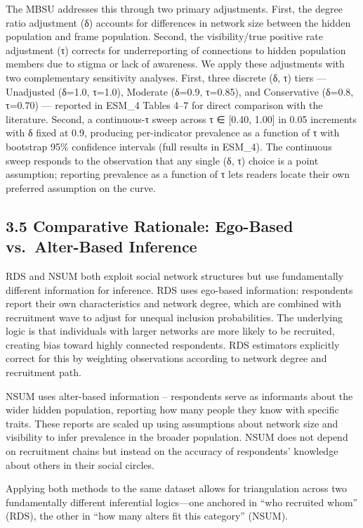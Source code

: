 \documentclass[
  12pt,
  letterpaper,
  DIV=11,
  numbers=noendperiod]{scrartcl}
\begin{document}
The MBSU addresses this through two primary adjustments. First, the
degree ratio adjustment (δ) accounts for differences in network size
between the hidden population and frame population. Second, the
visibility/true positive rate adjustment (τ) corrects for underreporting
of connections to hidden population members due to stigma or lack of
awareness. We apply these adjustments with two complementary sensitivity
analyses. First, three discrete (δ, τ) tiers --- Unadjusted (δ=1.0,
τ=1.0), Moderate (δ=0.9, τ=0.85), and Conservative (δ=0.8, τ=0.70) ---
reported in ESM\_4 Tables 4--7 for direct comparison with the
literature. Second, a continuous-τ sweep across τ ∈ {[}0.40, 1.00{]} in
0.05 increments with δ fixed at 0.9, producing per-indicator prevalence
as a function of τ with bootstrap 95\% confidence intervals (full
results in ESM\_4). The continuous sweep responds to the observation
that any single (δ, τ) choice is a point assumption; reporting
prevalence as a function of τ lets readers locate their own preferred
assumption on the curve.

\subsection{3.5 Comparative Rationale: Ego-Based vs.~Alter-Based
Inference}\label{comparative-rationale-ego-based-vs.-alter-based-inference}

RDS and NSUM both exploit social network structures but use
fundamentally different information for inference. RDS uses ego-based
information: respondents report their own characteristics and network
degree, which are combined with recruitment wave to adjust for unequal
inclusion probabilities. The underlying logic is that individuals with
larger networks are more likely to be recruited, creating bias toward
highly connected respondents. RDS estimators explicitly correct for this
by weighting observations according to network degree and recruitment
path.

NSUM uses alter-based information -- respondents serve as informants
about the wider hidden population, reporting how many people they know
with specific traits. These reports are scaled up using assumptions
about network size and visibility to infer prevalence in the broader
population. NSUM does not depend on recruitment chains but instead on
the accuracy of respondents' knowledge about others in their social
circles.

Applying both methods to the same dataset allows for triangulation
across two fundamentally different inferential logics---one anchored in
``who recruited whom'' (RDS), the other in ``how many alters fit this
category'' (NSUM).
\end{document}
